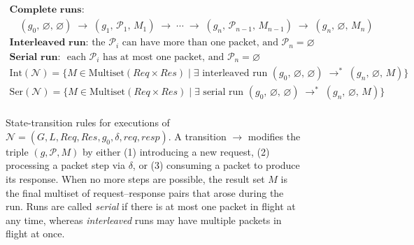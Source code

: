 \begin{figure}[t]
    \[
    \begin{array}{c}
    \textbf{Complete runs:}
    \\
    \quad (g_0,\,\varnothing,\,\varnothing) \;\longrightarrow\; (g_1,\,\mathcal{P}_1,\,M_1) \;\longrightarrow\; \cdots \;\longrightarrow\; (g_n,\,\mathcal{P}_{n-1},\,M_{n-1}) \;\longrightarrow\; (g_n,\,\varnothing,\,M_n)
    \\[1em]
    \textbf{Interleaved run: } \text{the } \mathcal{P}_i \text{ can have more than one packet, and } \mathcal{P}_n = \varnothing \\
    \textbf{Serial run: } \text{ each } \mathcal{P}_i \text{ has at most one packet, and } \mathcal{P}_n = \varnothing\\
    \text{Int}(\mathcal{N}) = \{ M \in \text{Multiset}(\mathit{Req} \times \mathit{Res}) \mid \exists \text{ interleaved run } (g_0,\,\varnothing,\,\varnothing) \;\longrightarrow^*\; (g_n,\,\varnothing,\,M) \}\\
    \text{Ser}(\mathcal{N}) = \{ M \in \text{Multiset}(\mathit{Req} \times \mathit{Res}) \mid \exists \text{ serial run } (g_0,\,\varnothing,\,\varnothing) \;\longrightarrow^*\; (g_n,\,\varnothing,\,M) \}\\
    \end{array}
    \]

    \caption{State-transition rules for executions of
    \(\mathcal{N} = (G, L, \mathit{Req}, \mathit{Res}, g_0, \delta, \mathit{req}, \mathit{resp})\).
    A transition \(\longrightarrow\) modifies the triple \((g,\mathcal{P},M)\) by either (1) introducing a new request, (2) processing a packet step via \(\delta\), or (3) consuming a packet to produce its response.  When no more steps are possible, the result set \(M\) is the final multiset of request--response pairs that arose during the run.
    Runs are called \emph{serial} if there is at most one packet in flight at any time, whereas \emph{interleaved} runs may have multiple packets in flight at once.}
    \label{fig:network-transitions}
\end{figure}


